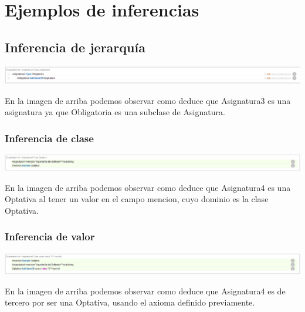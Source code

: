 \documentclass[11pt,a4paper]{article}
\begin{document}
\section*{Ejemplos de inferencias}

\subsection*{Inferencia de jerarquía}

\begin{center}
\includegraphics[width=1\textwidth]{./jerarquia.PNG}\par\vspace{1cm}
\end{center}

En la imagen de arriba podemos observar como deduce que Asignatura3 es una asignatura ya que Obligatoria es una subclase de Asignatura.

\subsubsection*{Inferencia de clase}

\begin{center}
\includegraphics[width=1\textwidth]{./clase.PNG}\par\vspace{1cm}
\end{center}

En la imagen de arriba podemos observar como deduce que Asignatura4 es una Optativa al tener un valor en el campo mencion, cuyo dominio es la clase Optativa.

\subsubsection*{Inferencia de valor}

\begin{center}
\includegraphics[width=1\textwidth]{./valor.PNG}\par\vspace{1cm}
\end{center}

En la imagen de arriba podemos observar como deduce que Asignatura4 es de tercero por ser una Optativa, usando el axioma definido previamente.
\end{document}
